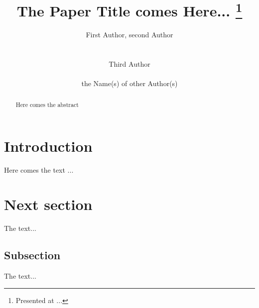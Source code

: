 \documentclass{appolb}
\begin{document}
\title{The Paper Title comes Here...%
\thanks{Presented at ...}%
}
\author{First Author, second Author
\address{affiliation}
\\[3mm]
{Third Author %
\address{affiliation}
}
\\[3mm]
the Name(s) of other Author(s)
\address{affiliation}
}
\maketitle
\begin{abstract}
Here comes the abstract
\end{abstract}
  
\section{Introduction}
Here comes the text ...

\section{Next section}
The text...
\subsection{Subsection}
The text...

\end{document}
